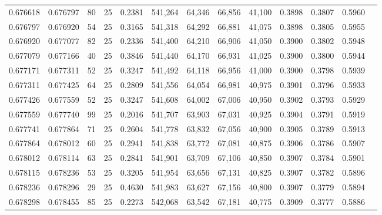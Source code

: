 \begin{tabular}{rrrrrrrrrrrrr}
0.676618 & 0.676797 &    80 &  25 &                                     0.2381 & 541,264 &  64,346 &  66,856 &  41,100 & 0.3898 & 0.3807 & 0.5960 \\
0.676797 & 0.676920 &    54 &  25 &                                     0.3165 & 541,318 &  64,292 &  66,881 &  41,075 & 0.3898 & 0.3805 & 0.5955 \\
0.676920 & 0.677077 &    82 &  25 &                                     0.2336 & 541,400 &  64,210 &  66,906 &  41,050 & 0.3900 & 0.3802 & 0.5948 \\
0.677079 & 0.677166 &    40 &  25 &                                     0.3846 & 541,440 &  64,170 &  66,931 &  41,025 & 0.3900 & 0.3800 & 0.5944 \\
0.677171 & 0.677311 &    52 &  25 &                                     0.3247 & 541,492 &  64,118 &  66,956 &  41,000 & 0.3900 & 0.3798 & 0.5939 \\
0.677311 & 0.677425 &    64 &  25 &                                     0.2809 & 541,556 &  64,054 &  66,981 &  40,975 & 0.3901 & 0.3796 & 0.5933 \\
0.677426 & 0.677559 &    52 &  25 &                                     0.3247 & 541,608 &  64,002 &  67,006 &  40,950 & 0.3902 & 0.3793 & 0.5929 \\
0.677559 & 0.677740 &    99 &  25 &                                     0.2016 & 541,707 &  63,903 &  67,031 &  40,925 & 0.3904 & 0.3791 & 0.5919 \\
0.677741 & 0.677864 &    71 &  25 &                                     0.2604 & 541,778 &  63,832 &  67,056 &  40,900 & 0.3905 & 0.3789 & 0.5913 \\
0.677864 & 0.678012 &    60 &  25 &                                     0.2941 & 541,838 &  63,772 &  67,081 &  40,875 & 0.3906 & 0.3786 & 0.5907 \\
0.678012 & 0.678114 &    63 &  25 &                                     0.2841 & 541,901 &  63,709 &  67,106 &  40,850 & 0.3907 & 0.3784 & 0.5901 \\
0.678115 & 0.678236 &    53 &  25 &                                     0.3205 & 541,954 &  63,656 &  67,131 &  40,825 & 0.3907 & 0.3782 & 0.5896 \\
0.678236 & 0.678296 &    29 &  25 &                                     0.4630 & 541,983 &  63,627 &  67,156 &  40,800 & 0.3907 & 0.3779 & 0.5894 \\
0.678298 & 0.678455 &    85 &  25 &                                     0.2273 & 542,068 &  63,542 &  67,181 &  40,775 & 0.3909 & 0.3777 & 0.5886 \\

\end{tabular}

